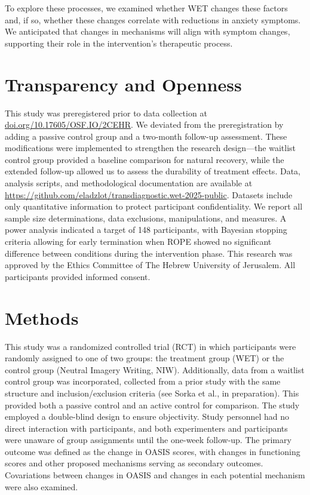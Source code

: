 \documentclass[
  man,floatsintext]{apa7}
\begin{document}
To explore these processes, we examined whether WET changes these factors and, if so, whether these changes correlate with reductions in anxiety symptoms.
We anticipated that changes in mechanisms will align with symptom changes, supporting their role in the intervention's therapeutic process.

\section{Transparency and Openness}\label{transparency-and-openness}

This study was preregistered prior to data collection at \url{doi.org/10.17605/OSF.IO/2CEHR}.
We deviated from the preregistration by adding a passive control group and a two-month follow-up assessment.
These modifications were implemented to strengthen the research design---the waitlist control group provided a baseline comparison for natural recovery, while the extended follow-up allowed us to assess the durability of treatment effects.
Data, analysis scripts, and methodological documentation are available at \url{https://github.com/eladzlot/transdiagnostic.wet-2025-public}.
Datasets include only quantitative information to protect participant confidentiality.
We report all sample size determinations, data exclusions, manipulations, and measures.
A power analysis indicated a target of 148 participants, with Bayesian stopping criteria allowing for early termination when ROPE showed no significant difference between conditions during the intervention phase.
This research was approved by the Ethics Committee of The Hebrew University of Jerusalem.
All participants provided informed consent.

\section{Methods}\label{methods}

This study was a randomized controlled trial (RCT) in which participants were randomly assigned to one of two groups: the treatment group (WET) or the control group (Neutral Imagery Writing, NIW).
Additionally, data from a waitlist control group was incorporated, collected from a prior study with the same structure and inclusion/exclusion criteria (see Sorka et al., in preparation).
This provided both a passive control and an active control for comparison.
The study employed a double-blind design to ensure objectivity.
Study personnel had no direct interaction with participants, and both experimenters and participants were unaware of group assignments until the one-week follow-up.
The primary outcome was defined as the change in OASIS scores, with changes in functioning scores and other proposed mechanisms serving as secondary outcomes.
Covariations between changes in OASIS and changes in each potential mechanism were also examined.
\end{document}

